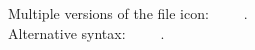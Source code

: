 \documentclass{article}
\begin{document}
Multiple versions of the file icon:
\faFile~
\faFile[solid]~
\faFile[regular]~.\\
Alternative syntax:
~
~
~.
\end{document}

